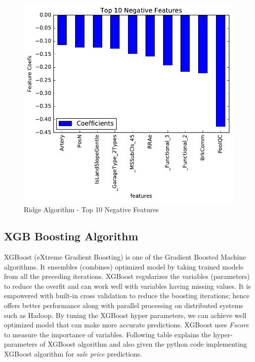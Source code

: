 \documentclass[sigconf]{acmart}
\begin{document}
	\begin{figure}[H]
		\centering
		\includegraphics[width=0.8\columnwidth]{images/ridge_feature_ranking_neg}	
		\caption{Ridge Algorithm - Top 10 Negative Features} \label{fig:ridge_feature_ranking_neg} 
	\end{figure}
	
	\subsection{XGB Boosting Algorithm}
	
	XGBoost (eXtreme Gradient Boosting) is one of the Gradient Boosted Machine algorithms. It ensembles (combines) optimized model by taking trained models from all the preceding iterations. XGBoost regularizes the variables (parameters) to reduce the overfit and can work well with variables having missing values. It is empowered with built-in cross validation to reduce the boosting iterations; hence offers better performance along with parallel processing on distributed systems such as Hadoop. By tuning the XGBoost hyper parameters, we can achieve well optimized model that can make more accurate predictions. XGBoost uses {\em Fscore} to measure the importance of  variables. Following table explains the hyper-parameters of XGBoost algorithm and also given the python code implementing XGBoost algorithm for {\em sale price} predictions.
	
\end{document}
